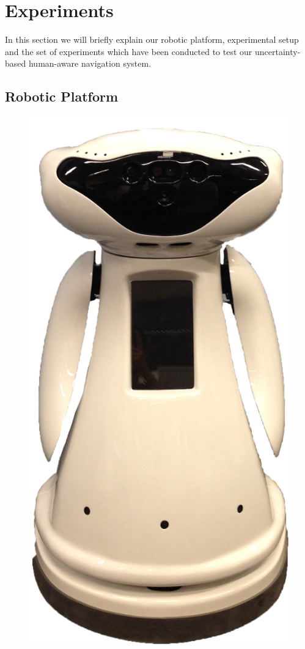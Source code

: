\section{Experiments}
\label{sec:experimental_setup}
In this section we will briefly explain our robotic platform, experimental setup and the set of experiments which have been conducted to test our uncertainty-based human-aware navigation system.

\subsection{Robotic Platform}
\label{sec:robot}

\begin{figure}
    \centering
    \includegraphics[scale=0.07]{pictures/robot.jpg}

\end{figure}
